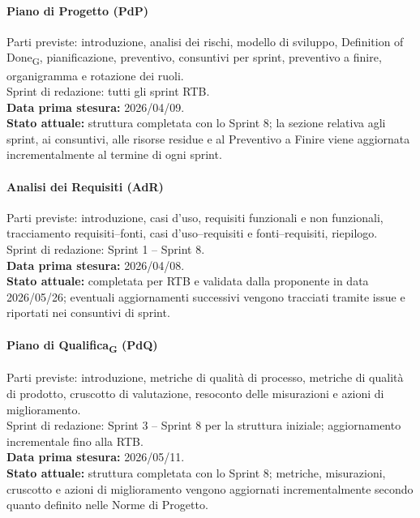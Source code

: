 \paragraph{Piano di Progetto (PdP)}
Parti previste: introduzione, analisi dei rischi, modello di sviluppo,
Definition of Done\textsubscript{G}, pianificazione, preventivo, consuntivi per
sprint, preventivo a finire, organigramma e rotazione dei ruoli.\\
Sprint di redazione: tutti gli sprint RTB.\\
\textbf{Data prima stesura:} 2026/04/09.\\
\textbf{Stato attuale:} struttura completata con lo Sprint 8; la sezione relativa
agli sprint, ai consuntivi, alle risorse residue e al Preventivo a Finire viene
aggiornata incrementalmente al termine di ogni sprint.

\paragraph{Analisi dei Requisiti (AdR)}
Parti previste: introduzione, casi d'uso, requisiti funzionali e non funzionali,
tracciamento requisiti--fonti, casi d'uso--requisiti e fonti--requisiti,
riepilogo.\\
Sprint di redazione: Sprint 1 -- Sprint 8.\\
\textbf{Data prima stesura:} 2026/04/08.\\
\textbf{Stato attuale:} completata per RTB e validata dalla proponente in data
2026/05/26; eventuali aggiornamenti successivi vengono tracciati tramite issue
e riportati nei consuntivi di sprint.

\paragraph{Piano di Qualifica\textsubscript{G} (PdQ)}
Parti previste: introduzione, metriche di qualità di processo, metriche di
qualità di prodotto, cruscotto di valutazione, resoconto delle misurazioni e
azioni di miglioramento.\\
Sprint di redazione: Sprint 3 -- Sprint 8 per la struttura iniziale; aggiornamento
incrementale fino alla RTB.\\
\textbf{Data prima stesura:} 2026/05/11.\\
\textbf{Stato attuale:} struttura completata con lo Sprint 8; metriche,
misurazioni, cruscotto e azioni di miglioramento vengono aggiornati
incrementalmente secondo quanto definito nelle Norme di Progetto.

